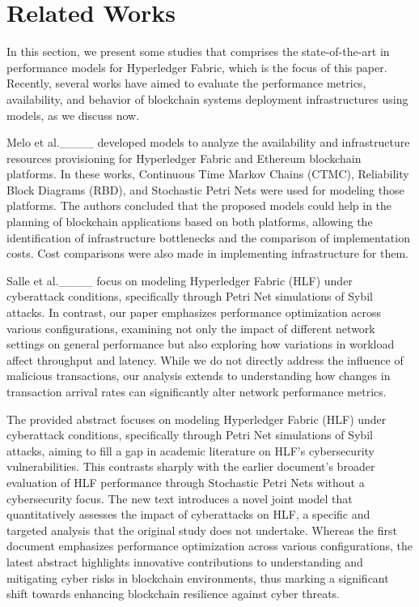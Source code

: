 \section{Related Works}
\label{sec:related_works}

In this section, we present some studies that comprises the state-of-the-art in performance models for Hyperledger Fabric, which is the focus of this paper. Recently, several works have aimed to evaluate the performance metrics, availability, and behavior of blockchain systems deployment infrastructures using models, as we discuss now.

Melo et al.____ developed models to analyze the availability and infrastructure resources provisioning for Hyperledger Fabric and Ethereum blockchain platforms. In these works, Continuous Time Markov Chains (CTMC), Reliability Block Diagrams (RBD), and Stochastic Petri Nets were used for modeling those platforms. The authors concluded that the proposed models could help in the planning of blockchain applications based on both platforms, allowing the identification of infrastructure bottlenecks and the comparison of implementation costs. Cost comparisons were also made in implementing infrastructure for them.

Salle et al.____ focus on modeling Hyperledger Fabric (HLF) under cyberattack conditions, specifically through Petri Net simulations of Sybil attacks. In contrast, our paper emphasizes performance optimization across various configurations, examining not only the impact of different network settings on general performance but also exploring how variations in workload affect throughput and latency. While we do not directly address the influence of malicious transactions, our analysis extends to understanding how changes in transaction arrival rates can significantly alter network performance metrics.

The provided abstract focuses on modeling Hyperledger Fabric (HLF) under cyberattack conditions, specifically through Petri Net simulations of Sybil attacks, aiming to fill a gap in academic literature on HLF’s cybersecurity vulnerabilities. This contrasts sharply with the earlier document's broader evaluation of HLF performance through Stochastic Petri Nets without a cybersecurity focus. The new text introduces a novel joint model that quantitatively assesses the impact of cyberattacks on HLF, a specific and targeted analysis that the original study does not undertake. Whereas the first document emphasizes performance optimization across various configurations, the latest abstract highlights innovative contributions to understanding and mitigating cyber risks in blockchain environments, thus marking a significant shift towards enhancing blockchain resilience against cyber threats.

